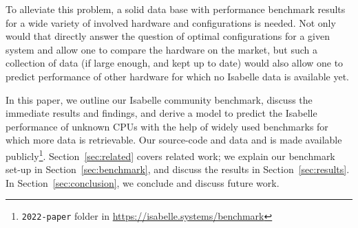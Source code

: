 To alleviate this problem,
a solid data base with performance benchmark results
for a wide variety of involved hardware and configurations
is needed.
Not only would that directly answer the question of optimal configurations for a given system
and allow one to compare the hardware on the market,
but such a collection of data
(if large enough, and kept up to date)
would also allow one to predict performance of other hardware for which no Isabelle data is available yet.

In this paper,
we outline our Isabelle community benchmark,
discuss the immediate results and findings,
and derive a model to predict the Isabelle performance of unknown CPUs
with the help of widely used benchmarks for which more data is retrievable.
Our source-code and data and is made available publicly\footnote{\texttt{2022-paper} folder in \url{https://isabelle.systems/benchmark}}.
Section~\ref{sec:related} covers related work;
we explain our benchmark set-up in Section~\ref{sec:benchmark},
and discuss the results in Section~\ref{sec:results}.
In Section~\ref{sec:conclusion},
we conclude and discuss future work.
